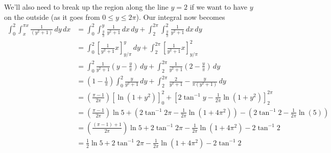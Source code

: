 \documentclass{article}
\newcommand{\lrp}[1]{\left( #1 \right)}
\newcommand{\lrb}[1]{\left[ #1 \right]}
\begin{document}
We'll also need to break up the region along the line $y=2$ if we want to have $y$ on the outside (as it goes from $0\leq y \leq 2\pi$). Our integral now becomes
\begin{align*}
    \int_0^2\int_x^{\pi x} \frac{1}{(y^2+1)}\,dy\,dx&=\int_0^2 \int_{\frac{y}{\pi}}^y\frac{1}{y^2+1}\,dx\,dy+\int_2^{2\pi}\int_{\frac{y}{\pi}}^2\frac{1}{y^2+1}\,dx\,dy\\
    &=\int_0^2\lrb{\frac{1}{y^2+1}x}_{y/\pi}^y\,dy+\int_2^{2\pi}\lrb{\frac{1}{y^2+1}x}_{y/\pi}^2\\
    &=\int_0^2 \frac{1}{y^2+1}\lrp{y-\frac{y}{\pi}}\,dy+\int_2^{2\pi}\frac{1}{y^2+1}\lrp{2-\frac{y}{\pi}}\,dy\\
    &=\lrp{1-\frac{1}{\pi}}\int_0^2\frac{y}{y^2+1}\,dy+\int_2^{2\pi} \frac{2}{y^2+1}-\frac{y}{\pi(y^2+1)}\,dy\\
    &=\lrp{\frac{\pi -1}{2\pi}}\lrb{\ln(1+y^2)}_0^2+\lrb{2\tan^{-1}y-\frac{1}{2\pi}\ln(1+y^2)}_2^{2\pi}\\
    &=\lrp{\frac{\pi-1}{2\pi}}\ln 5 + \lrp{2\tan^{-1}2\pi -\frac{1}{2\pi}\ln(1+4\pi^2)}-\lrp{2\tan^{-1}2-\frac{1}{2\pi}\ln(5)}\\
    &=\lrp{\frac{(\pi-1)+1}{2\pi}}\ln 5 + 2\tan^{-1}2\pi -\frac{1}{2\pi}\ln (1+4\pi^2)-2\tan^{-1}2\\
    &=\boxed{\frac{1}{2}\ln 5 + 2\tan^{-1}2\pi -\frac{1}{2\pi}\ln (1+4\pi^2)-2\tan^{-1}2}
\end{align*}
\end{document}

